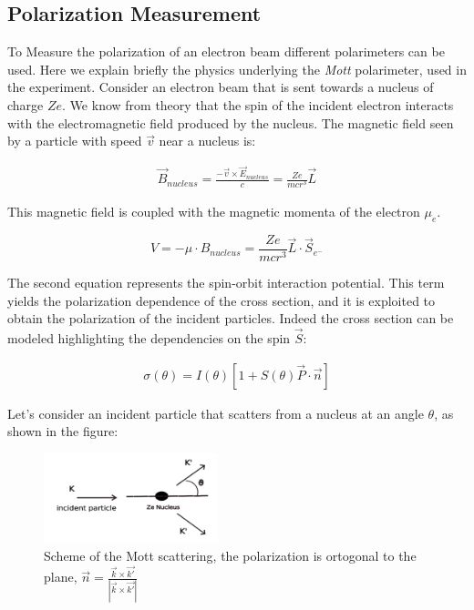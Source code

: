 \subsection{Polarization Measurement}

To Measure the polarization of an electron beam different polarimeters can be used. Here we explain briefly the physics underlying the \textit{Mott} polarimeter, used in the experiment.
Consider an electron beam that is sent towards a nucleus of charge $Ze$. We know from theory \cite{MottElectron} that the spin of the incident electron interacts with the electromagnetic field produced by the nucleus.
The magnetic field seen by a particle with speed $\vec{v}$ near a nucleus is:

\begin{align*}
\vec{B}_{nucleus} = \frac{-\vec{v} \times \vec{E}_{nucleus}}{c}  = \frac{Ze}{mc r^{3}} \vec{L} 
\end{align*}

This magnetic field is coupled with the magnetic momenta of the electron $\mu_{e}$.

\begin{equation}
V = - \mu \cdot B_{nucleus} = \frac{Ze}{mcr^{3}} \vec{L} \cdot \vec{S}_{e^{-}}
\end{equation}

The second equation represents the spin-orbit interaction potential. This term yields the polarization dependence of the cross section, and it is exploited to obtain the polarization of the incident particles. Indeed the cross section can be modeled highlighting the dependencies on the spin $\vec{S}$:

\begin{align*}
\sigma(\theta) = I(\theta) [1 + S(\theta) \vec{P} \cdot \vec{n} ]
\end{align*}

Let's consider an incident particle that scatters from a nucleus at an angle $\theta$, as shown in the figure:

\begin{figure}[hbtp]
\centering
\includegraphics[width = 0.45\textwidth]{ExperimentalSetup/mottFig.png}
\caption{Scheme of the Mott scattering, the polarization is ortogonal to the plane,  $ \vec{n} = \frac{\vec{k} \times \vec{k'}}{|\vec{k} \times \vec{k'}|}$}
\end{figure}

